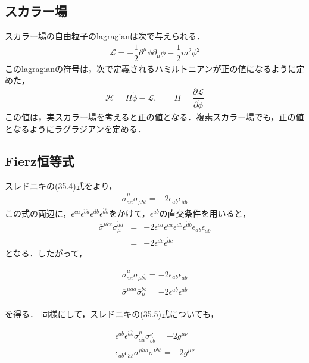 \subsection{スカラー場}
スカラー場の自由粒子のlagragianは次で与えられる．
\begin{eqnarray}
\mathcal{L}=-\dfrac{1}{2}\partial^{\mu}\phi\partial_{\mu}\phi-\dfrac{1}{2}m^2\phi^2
\end{eqnarray}
このlagragianの符号は，次で定義されるハミルトニアンが正の値になるように定めた，
\begin{eqnarray}
\mathcal{H}=\Pi\dot{\phi}-\mathcal{L},\qquad \Pi=\dfrac{\partial \mathcal{L}}{\partial \dot{\phi}}
\end{eqnarray}
この値は，実スカラー場を考えると正の値となる．複素スカラー場でも，正の値となるようにラグラジアンを定める．
\newpage
\subsection{Fierz恒等式}
スレドニキの(35.4)式をより，
\begin{eqnarray}
\label{A113}
\sigma^{\mu}_{a\dot{a}}\sigma_{\mu b\dot{b}}=-2\epsilon_{ab}\epsilon_{\dot{a}\dot{b}}
\end{eqnarray}
この式の両辺に，$\epsilon^{ca}\epsilon^{\dot{c}\dot{a}}\epsilon^{db}\epsilon^{\dot{d}\dot{b}}$をかけて，$\epsilon^{ab}$の直交条件を用いると，
\begin{eqnarray}
\label{A114}
\overline{\sigma}^{\mu \dot{c}c}\sigma_{\mu}^{\dot{d}d}&=&-2\epsilon^{ca}\epsilon^{\dot{c}\dot{a}}\epsilon^{db}\epsilon^{\dot{d}\dot{b}}\epsilon_{ab}\epsilon_{\dot{a}\dot{b}} \\
&=&-2\epsilon^{dc}\epsilon^{\dot{d}\dot{c}}
\end{eqnarray}
となる．したがって，
\begin{empheqboxed}

\begin{eqnarray}
\label{A115}
\sigma^{\mu}_{a\dot{a}}\sigma_{\mu b\dot{b}}=-2\epsilon_{ab}\epsilon_{\dot{a}\dot{b}} \\
\label{A116}
\overline{\sigma}^{\mu \dot{a}a}\overline{\sigma}_{\mu}^{\dot{b}b}=-2\epsilon^{ab}\epsilon^{\dot{a}\dot{b}}
\end{eqnarray}

\end{empheqboxed}
を得る．
同様にして，スレドニキの(35.5)式についても，
\begin{empheqboxed}

\begin{eqnarray}
\epsilon^{ab}\epsilon^{\dot{a}\dot{b}}\sigma^{\mu}_{a\dot{a}}\sigma^{\nu}_{b\dot{b}}=-2g^{\mu\nu} \\
\epsilon_{ab}\epsilon_{\dot{a}\dot{b}}\overline{\sigma}^{\mu \dot{a}a}\overline{\sigma}^{\nu\dot{b}b}=-2g^{\mu\nu}
\end{eqnarray}

\end{empheqboxed}
